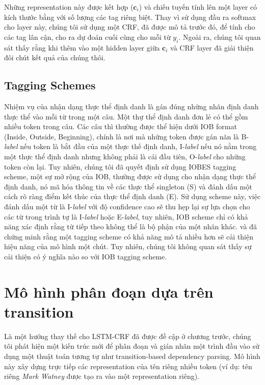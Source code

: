 \documentclass[11pt,letterpaper]{article}
\begin{document}
Những representation này được kết hợp ($\mathbf{c}_i$) và chiếu tuyến tính lên một layer có kích thước bằng với số lượng các tag riêng biệt. 
Thay vì sử dụng đầu ra softmax cho layer này, chúng tôi sử dụng một CRF, đã được mô tả trước đó, để tính cho các tag lân cận,  cho ra dự đoán cuối cùng cho mỗi từ $y_i$. 
Ngoài ra, chúng tôi quan sát thấy rằng khi thêm vào một hidden layer giữa $\mathbf{c}_i$ và CRF layer đã giải thiện đôi chút kết quả của chúng thôi.

\subsection{Tagging Schemes}
\label{IOBES}

Nhiệm vụ của nhận dạng thực thể định danh là gán đúng những nhãn định danh thực thể vào mỗi từ trong một câu.
Một thự thể định danh đơn lẻ có thể gồm nhiều token trong câu. Các câu thì thường được thể hiện dưới IOB format (Inside, Outside, Beginning), chính là nơi mà những token được gán nãn là B-\textit{label} nếu token là bắt đầu của một thực thế định danh, I-\textit{label} nếu nó nằm trong một thực thể định danh nhưng không phải là cái đầu tiên, O-\textit{label} cho những token còn lại. Tuy nhiên, chúng tôi đã quyết định sử dụng IOBES tagging scheme, một sự mở rộng của IOB, thường được sử dụng cho nhận dạng thực thể định danh, nó mã hóa thông tin về các thực thể singleton (S) và đánh dấu một cách rõ ràng điểm kết thúc của thực thể định danh (E). Sử dụng scheme này, việc đánh dấu một từ là I-\textit{label} với độ confidence cao sẽ thu hẹp lại sự lựa chọn cho các từ trong trình tự là I-\textit{label} hoặc E-\textit{label}, tuy nhiên, IOB scheme chỉ có khả năng xác định rằng từ tiếp theo không thể là bộ phận của một nhãn khác.  và  đã chứng minh rằng một tagging scheme có khả năng mô tả nhiều hơn sẽ cải thiện hiệu năng của mô hình một chút. Tuy nhiên, chúng tôi không quan sát thấy sự cải thiện có ý nghĩa nào so với IOB tagging scheme.

\section{Mô hình phân đoạn dựa trên transition}
\label{stacklstm}

Là một hướng thay thế cho LSTM-CRF đã được đề cập ở chương trước, chúng tôi phát hiện một kiến trúc mới để phân đoạn và gián nhãn một trình đầu vào sử dụng một thuật toán tương tự như transition-based dependency parsing. Mô hình này xây dựng trực tiếp các representation của tên riêng nhiều token (ví dụ: tên riêng \emph{Mark Watney} được tạo ra vào một representation riêng).
\end{document}
